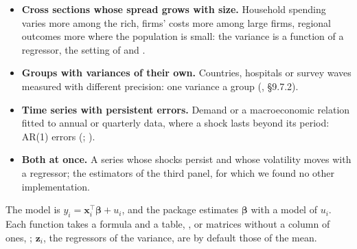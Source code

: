 \begin{itemize}
  \item \textbf{Cross sections whose spread grows with size.} Household spending varies more among the rich, firms'
    costs more among large firms, regional outcomes more where the population is small: the variance is a function of
    a regressor, the setting of  and .
  \item \textbf{Groups with variances of their own.} Countries, hospitals or survey waves measured with different
    precision: one variance a group (, §9.7.2).
  \item \textbf{Time series with persistent errors.} Demand or a macroeconomic relation fitted to annual or quarterly
    data, where a shock lasts beyond its period: AR(1) errors (;
    ).
  \item \textbf{Both at once.} A series whose shocks persist and whose volatility moves with a regressor; the
    estimators of the third panel, for which we found no other implementation.
\end{itemize}

The model is $y_i = \mathbf{x}_i^\top\boldsymbol\beta + u_i$, and the package estimates $\boldsymbol\beta$ with a
model of $u_i$. Each function takes a formula and a table, , or matrices without a column of ones, ; $\mathbf{z}_i$, the
regressors of the variance, are by default those of the mean.

